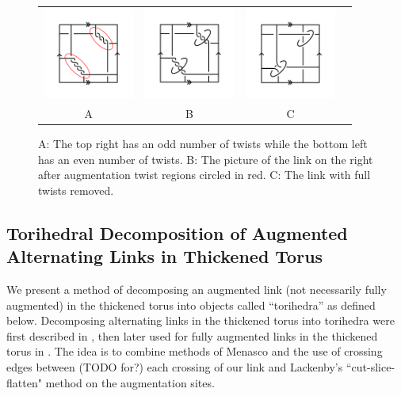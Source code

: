 \documentclass[11pt]{amsart}
\theoremstyle{plain}
\theoremstyle{definition}
\begin{document}
\begin{figure}
\centering
\begin{tabular}{cccc}
\includegraphics[width=3cm]{fig1.png}&
\includegraphics[width=3cm]{twist-augment.png}&
\includegraphics[width=3cm]{fig-2.png}\\
A&B&C
\end{tabular}
	 \caption{A: The top right has an odd number of twists while the bottom left has
	 an even number of twists. B: The picture of the link on the right after
	 augmentation twist regions circled in red. C: The link with full twists
	 removed.}
\label{fig:Augmentations}
\end{figure}

\subsection{Torihedral Decomposition of Augmented Alternating Links in Thickened Torus}


We present a method of decomposing an augmented link
(not necessarily fully augmented) in the thickened torus into
objects called ``torihedra'' as defined below.
Decomposing alternating links in the thickened torus into 
torihedra were first described in \cite{CKP2},
then later used for fully augmented links in 
the thickened torus in \cite{kwon2020fully}.
The idea is to combine methods of Menasco
\cite{Menasco} and the use of crossing edges
between (TODO for?) each crossing of our link
and Lackenby's ``cut-slice-flatten" method \cite{lackenby}
on the augmentation
sites.
\end{document}
